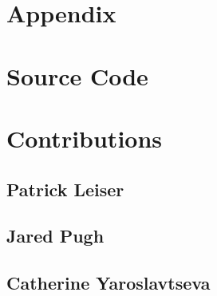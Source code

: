 \documentclass{article}
\begin{document}
\section{Appendix}
\appendix

\section{Source Code}

\section{Contributions}

\subsection{Patrick Leiser}

\subsection{Jared Pugh}

\subsection{Catherine Yaroslavtseva}
\end{document}
